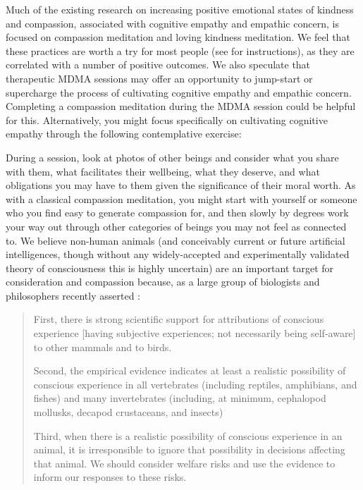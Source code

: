 \documentclass[12pt,letterpaper]{book}
\begin{document}
Much of the existing research on increasing positive emotional states of kindness and compassion, associated with cognitive empathy and empathic concern, is focused on compassion meditation and loving kindness meditation. We feel that these practices are worth a try for most people (see \textcite{lkMeditation} for instructions), as they are correlated with a number of positive outcomes. We also speculate that therapeutic MDMA sessions may offer an opportunity to jump-start or supercharge the process of cultivating cognitive empathy and empathic concern. Completing a compassion meditation during the MDMA session could be helpful for this. Alternatively, you might focus specifically on cultivating cognitive empathy through the following contemplative exercise:

During a session, look at photos of other beings and consider what you share with them, what facilitates their wellbeing, what they deserve, and what obligations you may have to them given the significance of their moral worth. As with a classical compassion meditation, you might start with yourself or someone who you find easy to generate compassion for, and then slowly by degrees work your way out through other categories of beings you may not feel as connected to. We believe non-human animals (and conceivably current or future artificial intelligences, though without any widely-accepted and experimentally validated theory of consciousness this is highly uncertain) are an important target for consideration and compassion because, as a large group of biologists and philosophers recently asserted \cite{newYorkAnimal}:

\begin{quotation}
    First, there is strong scientific support for attributions of conscious experience [having subjective experiences; not necessarily being self-aware] to other mammals and to birds.
    
    Second, the empirical evidence indicates at least a realistic possibility of conscious experience in all vertebrates (including reptiles, amphibians, and fishes) and many invertebrates (including, at minimum, cephalopod mollusks, decapod crustaceans, and insects)

    Third, when there is a realistic possibility of conscious experience in an animal, it is irresponsible to ignore that possibility in decisions affecting that animal. We should consider welfare risks and use the evidence to inform our responses to these risks.
\end{quotation}
\end{document}
